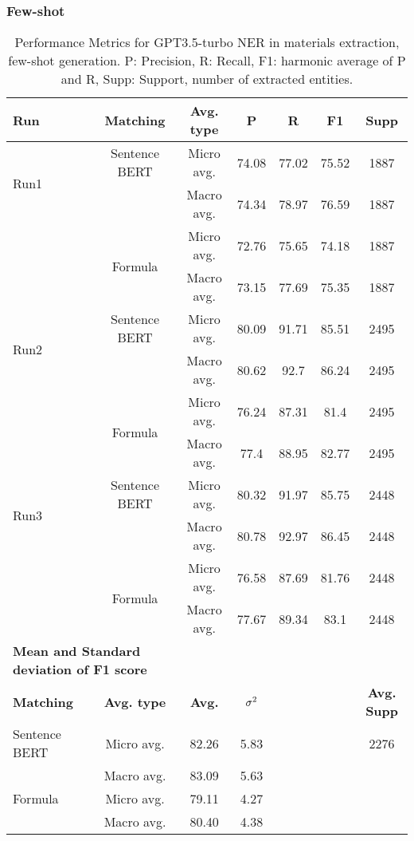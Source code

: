 \clearpage
\subsubsection{Few-shot}

\begin{table}[htbp]
\small
  \centering
  \caption{Performance Metrics for GPT3.5-turbo NER in materials extraction, few-shot generation. P: Precision, R: Recall, F1: harmonic average of P and R, Supp: Support, number of extracted entities.}
  \begin{tabular}{lcccccc}
    \toprule
    \textbf{Run} & \textbf{Matching} & \textbf{Avg. type} & \textbf{P} & \textbf{R} & \textbf{F1} & \textbf{Supp} \\
    \midrule
    \multirow{2}{*}{Run1} & Sentence BERT & Micro avg. & 74.08 & 77.02 & 75.52 & 1887 \\
    & & Macro avg. & 74.34 & 78.97 & 76.59 & 1887 \\
    \cmidrule{2-7}
    & \multirow{2}{*}{Formula} & Micro avg. & 72.76 & 75.65 & 74.18 & 1887 \\
    & & Macro avg. & 73.15 & 77.69 & 75.35 & 1887 \\
    \midrule
    \multirow{2}{*}{Run2} & Sentence BERT & Micro avg. & 80.09 & 91.71 & 85.51 & 2495 \\
    & & Macro avg. & 80.62 & 92.7 & 86.24 & 2495 \\
    \cmidrule{2-7}
    & \multirow{2}{*}{Formula} & Micro avg. & 76.24 & 87.31 & 81.4 & 2495 \\
    & & Macro avg. & 77.4 & 88.95 & 82.77 & 2495 \\
    \midrule
    \multirow{2}{*}{Run3} & Sentence BERT & Micro avg. & 80.32 & 91.97 & 85.75 & 2448 \\
    & & Macro avg. & 80.78 & 92.97 & 86.45 & 2448 \\
    \cmidrule{2-7}
    & \multirow{2}{*}{Formula} & Micro avg. & 76.58 & 87.69 & 81.76 & 2448 \\
    & & Macro avg. & 77.67 & 89.34 & 83.1 & 2448 \\
    \midrule
    \multicolumn{2}{l}{\textbf{Mean and Standard deviation of F1 score}} & & & & & \\
    \midrule
    \textbf{Matching} & \textbf{Avg. type} & \textbf{Avg.} & $\sigma\textsuperscript{2}$ & & & \textbf{Avg. Supp}\\
    Sentence BERT & Micro avg. & 82.26 & 5.83 & & & 2276 \\
    & Macro avg. & 83.09 & 5.63 & & & \\
    Formula & Micro avg. & 79.11 & 4.27 & & & \\
    & Macro avg. & 80.40 & 4.38 & & & \\
    \bottomrule
  \end{tabular}
\end{table}


